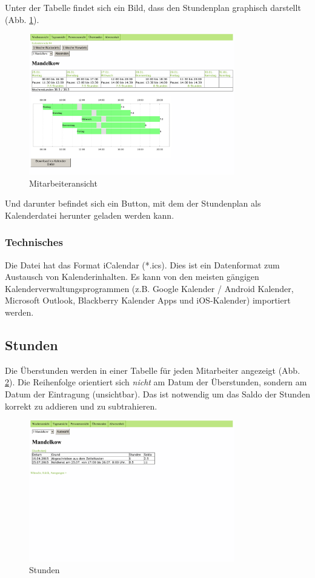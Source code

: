 \documentclass[10pt,a4paper,titlepage,oneside]{article}
\begin{document}
Unter der Tabelle findet sich ein Bild, dass den Stundenplan graphisch darstellt (Abb. \ref{fig:Mitarbeiteransicht}).
\begin{figure}[h]
\centering
\includegraphics[width=0.8\textwidth]{mitarbeiter-out}
\caption{Mitarbeiteransicht}
\label{fig:Mitarbeiteransicht}
\end{figure}
Und darunter befindet sich ein Button, mit dem der Stundenplan als Kalenderdatei herunter geladen werden kann.



\subsubsection{Technisches}
Die Datei hat das Format iCalendar (*.ics). Dies ist ein Datenformat zum Austausch von Kalenderinhalten. Es kann von den meisten gängigen Kalenderverwaltungsprogrammen (z.B. Google Kalender / Android Kalender, Microsoft Outlook, Blackberry Kalender Apps und iOS-Kalender) importiert werden.




\subsection{Stunden}
Die Überstunden werden in einer Tabelle für jeden Mitarbeiter angezeigt (Abb. \ref{fig:Stunden}).
Die Reihenfolge orientiert sich \emph{nicht} am Datum der Überstunden, sondern am Datum der Eintragung (unsichtbar). Das ist notwendig um das Saldo der Stunden korrekt zu addieren und zu subtrahieren.

\begin{figure}[h]
\centering
\includegraphics[width=0.8\textwidth]{stunden-out}
\caption{Stunden}
\label{fig:Stunden}
\end{figure}
\end{document}
